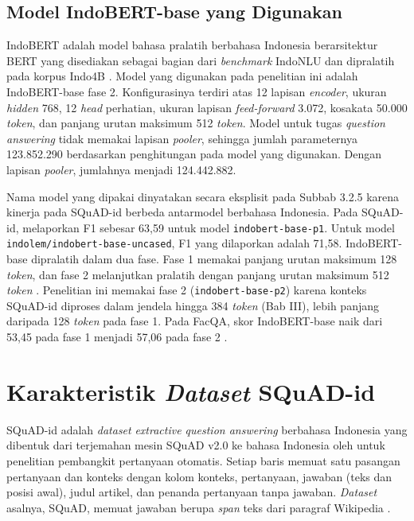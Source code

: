 \subsection{Model IndoBERT-base yang Digunakan}

IndoBERT adalah model bahasa pralatih berbahasa Indonesia berarsitektur BERT yang disediakan sebagai bagian dari \textit{benchmark} IndoNLU dan dipralatih pada korpus Indo4B \parencite{wilie2020indonlu}. Model yang digunakan pada penelitian ini adalah IndoBERT-base fase 2. Konfigurasinya terdiri atas 12 lapisan \textit{encoder}, ukuran \textit{hidden} 768, 12 \textit{head} perhatian, ukuran lapisan \textit{feed-forward} 3.072, kosakata 50.000 \textit{token}, dan panjang urutan maksimum 512 \textit{token}. Model untuk tugas \textit{question answering} tidak memakai lapisan \textit{pooler}, sehingga jumlah parameternya 123.852.290 berdasarkan penghitungan pada model yang digunakan. Dengan lapisan \textit{pooler}, jumlahnya menjadi 124.442.882.

Nama model yang dipakai dinyatakan secara eksplisit pada Subbab 3.2.5 karena kinerja pada SQuAD-id berbeda antarmodel berbahasa Indonesia. Pada SQuAD-id, \textcite{suhendra2026matrik} melaporkan F1 sebesar 63,59 untuk model \texttt{indobert-base-p1}. Untuk model \texttt{indolem/indobert-base-uncased}, F1 yang dilaporkan adalah 71,58. IndoBERT-base dipralatih dalam dua fase. Fase 1 memakai panjang urutan maksimum 128 \textit{token}, dan fase 2 melanjutkan pralatih dengan panjang urutan maksimum 512 \textit{token} \parencite{wilie2020indonlu}. Penelitian ini memakai fase 2 (\texttt{indobert-base-p2}) karena konteks SQuAD-id diproses dalam jendela hingga 384 \textit{token} (Bab III), lebih panjang daripada 128 \textit{token} pada fase 1. Pada FacQA, skor IndoBERT-base naik dari 53,45 pada fase 1 menjadi 57,06 pada fase 2 \parencite{wilie2020indonlu}.

\section{Karakteristik \textit{Dataset} SQuAD-id}

SQuAD-id adalah \textit{dataset} \textit{extractive question answering} berbahasa Indonesia yang dibentuk dari terjemahan mesin SQuAD v2.0 ke bahasa Indonesia oleh \textcite{muis2020sequence} untuk penelitian pembangkit pertanyaan otomatis. Setiap baris memuat satu pasangan pertanyaan dan konteks dengan kolom konteks, pertanyaan, jawaban (teks dan posisi awal), judul artikel, dan penanda pertanyaan tanpa jawaban. \textit{Dataset} asalnya, SQuAD, memuat jawaban berupa \textit{span} teks dari paragraf Wikipedia \parencite{rajpurkar2016squad}.

